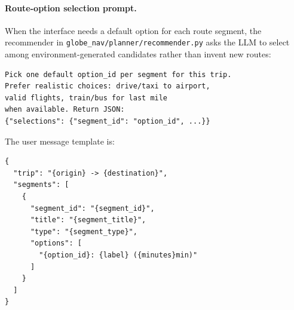 \documentclass[11pt]{article}
\begin{document}
\paragraph{Route-option selection prompt.}
When the interface needs a default option for each route segment, the recommender in \texttt{globe\_nav/planner/recommender.py} asks the LLM to select among environment-generated candidates rather than invent new routes:
\begin{lstlisting}[style=promptstyle]
Pick one default option_id per segment for this trip.
Prefer realistic choices: drive/taxi to airport,
valid flights, train/bus for last mile
when available. Return JSON:
{"selections": {"segment_id": "option_id", ...}}
\end{lstlisting}
The user message template is:
\begin{lstlisting}[style=promptstyle]
{
  "trip": "{origin} -> {destination}",
  "segments": [
    {
      "segment_id": "{segment_id}",
      "title": "{segment_title}",
      "type": "{segment_type}",
      "options": [
        "{option_id}: {label} ({minutes}min)"
      ]
    }
  ]
}
\end{lstlisting}
\end{document}

